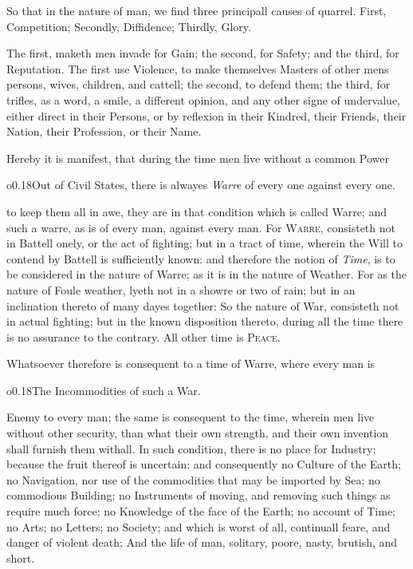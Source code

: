 So that in the nature of man, we find three principall causes of
quarrel. First, Competition; Secondly, Diffidence; Thirdly, Glory.

The first, maketh men invade for Gain; the second, for Safety; and the
third, for Reputation. The first use Violence, to make themselves
Masters of other mens persons, wives, children, and cattell; the
second, to defend them; the third, for trifles, as a word, a smile, a
different opinion, and any other signe of undervalue, either direct in
their Persons, or by reflexion in their Kindred, their Friends, their
Nation, their Profession, or their Name.

Hereby it is manifest, that during the time men live without a common
Power \begin{wrapfigure}[6]{o}{0.18\textwidth}\wrapadj Out of Civil
States, there is alwayes \emph{Warre} of every one against every one.
\end{wrapfigure} to keep them all in awe, they are in that condition
which is called Warre; and such a warre, as is of every man, against
every man. For \textsc{Warre}, consisteth not in Battell onely, or the
act of fighting; but in a tract of time, wherein the Will to contend
by Battell is sufficiently known: and therefore the  notion
of \textit{Time}, is to be considered in the nature of Warre; as it is
in the nature of Weather. For as the nature of Foule weather, lyeth
not in a showre or two of rain; but in an inclination thereto of many
dayes together: So the nature of War, consisteth not in actual
fighting; but in the known disposition thereto, during all the time
there is no assurance to the contrary. All other time is
\textsc{Peace}.

Whatsoever therefore is consequent to a time of Warre, where every man
is \begin{wrapfigure}[4]{o}{0.18\textwidth}\wrapadj The Incommodities
of such a War. \end{wrapfigure} Enemy to every man; the same is
consequent to the time, wherein men live without other security, than
what their own strength, and their own invention shall furnish them
withall. In such condition, there is no place for Industry; because
the fruit thereof is uncertain: and consequently no Culture of the
Earth; no Navigation, nor use of the commodities that may be imported
by Sea; no commodious Building; no Instruments of moving, and removing
such things as require much force; no Knowledge of the face of the
Earth; no account of Time; no Arts; no Letters; no Society; and which
is worst of all, continuall feare, and danger of violent death; And
the life of man, solitary, poore, nasty, brutish, and short.

